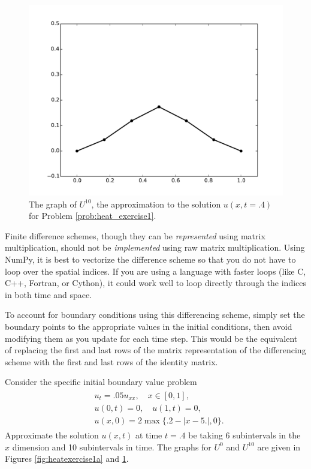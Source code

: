 \begin{figure}
\centering
\includegraphics[width=\textwidth]{heatexercise1b.pdf}
\caption{The graph of $U^{10}$, the approximation to the solution $u(x,t=.4)$ for Problem \ref{prob:heat_exercise1}.}
\label{fig:heatexercise1b}
\end{figure}

\begin{info}
Finite difference schemes, though they can be \emph{represented} using matrix multiplication, should not be \emph{implemented} using raw matrix multiplication.
Using NumPy, it is best to vectorize the difference scheme so that you do not have to loop over the spatial indices.
If you are using a language with faster loops (like C, C++, Fortran, or Cython), it could work well to loop directly through the indices in both time and space.
\end{info}

To account for boundary conditions using this differencing scheme, simply set the boundary points to the appropriate values in the initial conditions, then avoid modifying them as you update for each time step.
This would be the equivalent of replacing the first and last rows of the matrix representation of the differencing scheme with the first and last rows of the identity matrix.

\begin{problem}
\label{prob:heat_exercise1}
Consider the specific initial boundary value problem
\begin{align}
	\begin{split}
	&{ } u_t = .05 u_{xx}, \quad x \in [0,1], \\
	&{ } u(0,t) = 0,\quad u(1,t) = 0,\\
	&{ } u(x,0) = 2\max\{.2 - |x-5.|,0\}.
	\end{split}
\end{align}
Approximate the solution $u(x,t)$ at time $t = .4$ be taking 6 subintervals in the $x$ dimension and 10 subintervals in time. 
The graphs for $U^0$ and $U^{10}$ are given in Figures \ref{fig:heatexercise1a} and \ref{fig:heatexercise1b}.
\end{problem}

